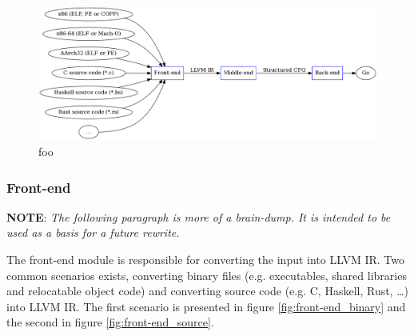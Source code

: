 

\begin{figure}[htbp]
	\begin{center}
		\includegraphics[width=\textwidth]{inc/decompilation_pipeline.png}
		\caption{foo}
		\label{fig:decompilation_pipeline}
	\end{center}
\end{figure}


\subsubsection{Front-end}


\textbf{NOTE}: \textit{The following paragraph is more of a brain-dump. It is intended to be used as a basis for a future rewrite.}

The front-end module is responsible for converting the input into LLVM IR. Two common scenarios exists, converting binary files (e.g. executables, shared libraries and relocatable object code) and converting source code (e.g. C, Haskell, Rust, …) into LLVM IR. The first scenario is presented in figure \ref{fig:front-end_binary} and the second in figure \ref{fig:front-end_source}.

